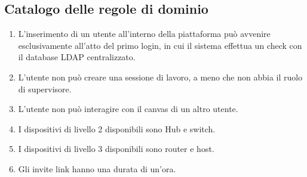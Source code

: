 \documentclass[../main.tex]{subfiles}
\begin{document}
\subsection{Catalogo delle regole di dominio}
\begin{enumerate}
    \setlength\itemsep{1em}
    \item L'inserimento di un utente all'interno della piattaforma pu\`o avvenire esclusivamente all'atto del primo login, in cui il sistema effettua un check con il database LDAP centralizzato.

    \item L'utente non pu\`o creare una sessione di lavoro, a meno che non abbia il ruolo di supervisore.

    \item L'utente non pu\`o interagire con il canvas di un altro utente.

    \item I dispositivi di livello 2 disponibili sono Hub e switch.

    \item I dispositivi di livello 3 disponibili sono router e host.

    \item Gli invite link hanno una durata di un'ora.

\end{enumerate}
\end{document}
